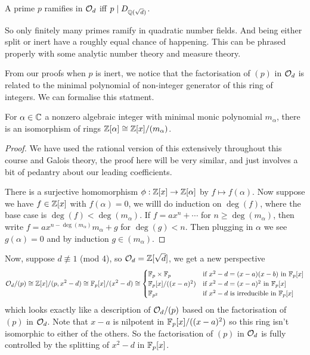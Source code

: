 \documentclass{article}
\begin{document}
\begin{corollary}
    A prime $p$ ramifies in $\mathcal{O}_d$ iff $p\mid D_{\mathbb{Q}(\sqrt{d})}$.
\end{corollary}

So only finitely many primes ramify in quadratic number fields. And being either split or inert have a roughly equal chance of happening. This can be phrased properly with some analytic number theory and measure theory.

From our proofs when $p$ is inert, we notice that the factorisation of $(p)$ in $\mathcal{O}_d$ is related to the minimal polynomial of non-integer generator of this ring of integers. We can formalise this statment.

\begin{proposition}
    For $\alpha\in\mathbb{C}$ a nonzero algebraic integer with minimal monic polynomial $m_\alpha$, there is an isomorphism of rings $\mathbb{Z}[\alpha]\cong \mathbb{Z}[x]/(m_\alpha)$.
    \begin{proof}
        We have used the rational version of this extensively throughout this course and Galois theory, the proof here will be very similar, and just involves a bit of pedantry about our leading coefficients.

        There is a surjective homomorphism $\phi:\mathbb{Z}[x]\rightarrow \mathbb{Z}[\alpha]$ by $f\mapsto f(\alpha)$. Now suppose we have $f\in\mathbb{Z}[x]$ with $f(\alpha)=0$, we willl do induction on $\deg(f)$, where the base case is $\deg(f)<\deg(m_\alpha)$. If $f=ax^n+\cdots$ for $n\geq\deg(m_\alpha)$, then write $f=ax^{n-\deg(m_\alpha)}m_\alpha+g$ for $\deg(g)<n$. Then plugging in $\alpha$ we see $g(\alpha)=0$ and by induction $g\in(m_\alpha)$.
    \end{proof}
\end{proposition}

Now, suppose $d\not\equiv 1$ (mod 4), so $\mathcal{O}_d=\mathbb{Z}[\sqrt{d}]$, we get a new perspective \[
\mathcal{O}_d/(p)\cong \mathbb{Z}[x]/(p,x^2-d)\cong \mathbb{F}_p[x]/(x^2-d) \cong \begin{cases}
    \mathbb{F}_p\times \mathbb{F}_p & \text{if $x^2-d=(x-a)(x-b)$ in $\mathbb{F}_p[x]$} \\
    \mathbb{F}_p[x]/((x-a)^2) & \text{if $x^2-d=(x-a)^2$ in $\mathbb{F}_p[x]$} \\
    \mathbb{F}_{p^2} & \text{if $x^2-d$ is irreducible in $\mathbb{F}_p[x]$}
\end{cases}
\] which looks exactly like a description of $\mathcal{O}_d/(p)$ based on the factorisation of $(p)$ in $\mathcal{O}_d$. Note that $x-a$ is nilpotent in $\mathbb{F}_p[x]/((x-a)^2)$ so this ring isn't isomorphic to either of the others. So the factorisation of $(p)$ in $\mathcal{O}_d$ is fully controlled by the splitting of $x^2-d$ in $\mathbb{F}_p[x]$.
\end{document}
